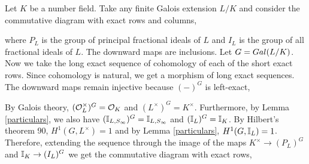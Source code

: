\documentclass[12pt]{extarticle}
\begin{document}
Let $K$ be a number field. Take any finite Galois extension $L/K$ and
consider the commutative diagram with exact rows and columns,
\begin{center}
\end{center}
where $P_L$ is the group of principal fractional ideals of $L$ and $I_L$ is the group of all fractional ideals of $L$. The downward maps are inclusions. Let $G = Gal \small(L/K \small)$. Now we take the long exact sequence of cohomology of each of the short exact rows. Since cohomology is natural, we get a morphism of long exact sequences. The downward maps remain injective because $(-)^G$ is left-exact,
\begin{center}
\end{center}
By Galois theory, $(\mathcal{O}_{L}^\times)^G = \mathcal{O}_{K}$ and $(L^\times)^G = K^\times$. Furthermore, by Lemma \ref{particulars}, we also have $(\mathbb{I}_{L, S_\infty})^G = \mathbb{I}_{L, S_{\infty}}$ and $(\mathbb{I}_{L})^G = \mathbb{I}_{K}$. By Hilbert's theorem 90, $H^1(G, L^\times) = 1$ and by Lemma \ref{particulars}, $H^1(G, \mathbb{I}_{L}) = 1$. Therefore, extending the sequence through the image of the maps $K^\times \to (P_L)^G$ and $\mathbb{I}_{K} \to (I_L)^G$ we get the commutative diagram with exact rows, 
\begin{center}
\end{center}
\end{document}
